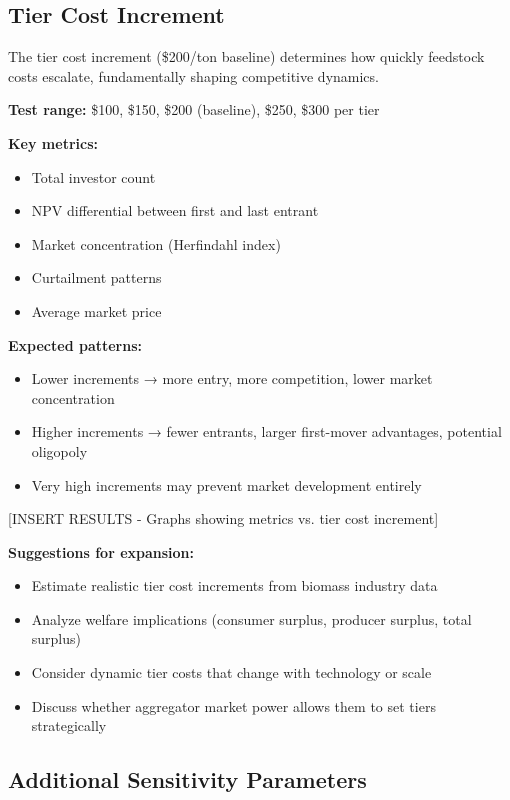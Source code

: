 \documentclass[10.5pt]{article}
\begin{document}
\subsection{Tier Cost Increment}

The tier cost increment (\$200/ton baseline) determines how quickly feedstock costs escalate, fundamentally shaping competitive dynamics.

\textbf{Test range:} \$100, \$150, \$200 (baseline), \$250, \$300 per tier

\textbf{Key metrics:}
\begin{itemize}
    \item Total investor count
    \item NPV differential between first and last entrant
    \item Market concentration (Herfindahl index)
    \item Curtailment patterns
    \item Average market price
\end{itemize}

\textbf{Expected patterns:}
\begin{itemize}
    \item Lower increments → more entry, more competition, lower market concentration
    \item Higher increments → fewer entrants, larger first-mover advantages, potential oligopoly
    \item Very high increments may prevent market development entirely
\end{itemize}

[INSERT RESULTS - Graphs showing metrics vs. tier cost increment]

\textbf{Suggestions for expansion:}
\begin{itemize}
    \item Estimate realistic tier cost increments from biomass industry data
    \item Analyze welfare implications (consumer surplus, producer surplus, total surplus)
    \item Consider dynamic tier costs that change with technology or scale
    \item Discuss whether aggregator market power allows them to set tiers strategically
\end{itemize}

\subsection{Additional Sensitivity Parameters}
\end{document}
